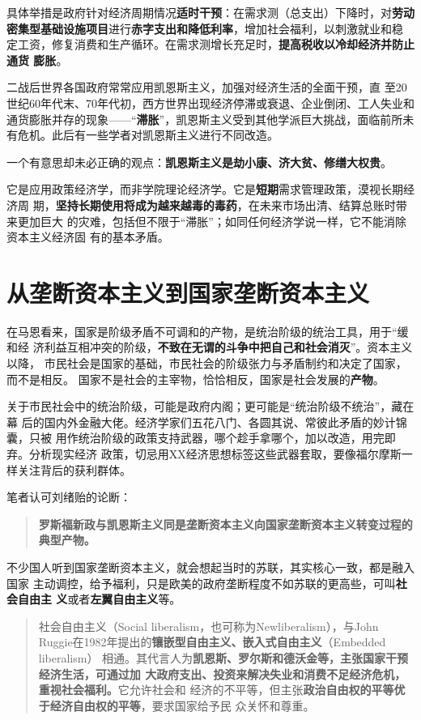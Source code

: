 具体举措是政府针对经济周期情况\textbf{适时干预}：在需求测（总支出）下降时，对\textbf{劳动
  密集型基础设施项目}进行\textbf{赤字支出和降低利率}，增加社会福利，以刺激就业和稳
定工资，修复消费和生产循环。在需求测增长充足时，\textbf{提高税收以冷却经济并防止通货
膨胀}。


二战后世界各国政府常常应用凯恩斯主义，加强对经济生活的全面干预，直
至20世纪60年代末、70年代初，西方世界出现经济停滞或衰退、企业倒闭、工人失业和
通货膨胀并存的现象——“\textbf{滞胀}”，凯恩斯主义受到其他学派巨大挑战，面临前所未
有危机。此后有一些学者对凯恩斯主义进行不同改造。

一个有意思却未必正确的观点：\textbf{凯恩斯主义是劫小康、济大贫、修缮大权贵}。

它是应用政策经济学，而非学院理论经济学。它是\textbf{短期}需求管理政策，漠视长期经济周
期，\textbf{坚持长期使用将成为越来越毒的毒药}，在未来市场出清、结算总账时带来更加巨大
的灾难，包括但不限于“滞胀”；如同任何经济学说一样，它不能消除资本主义经济固
有的基本矛盾。

\section{从垄断资本主义到国家垄断资本主义}

在马恩看来，国家是阶级矛盾不可调和的产物，是统治阶级的统治工具，用于“缓和经
济利益互相冲突的阶级，\textbf{不致在无谓的斗争中把自己和社会消灭}”。资本主义以降，
市民社会是国家的基础，市民社会的阶级张力与矛盾制约和决定了国家，而不是相反。
国家不是社会的主宰物，恰恰相反，国家是社会发展的\textbf{产物}。

关于市民社会中的统治阶级，可能是政府内阁；更可能是“统治阶级不统治”，藏在幕
后的国内外金融大佬。经济学家们五花八门、各圆其说、常彼此矛盾的妙计锦囊，只被
用作统治阶级的政策支持武器，哪个趁手拿哪个，加以改造，用完即弃。分析现实经济
政策，切忌用XX经济思想标签这些武器套取，要像福尔摩斯一样关注背后的获利群体。

笔者认可刘绪贻的论断：
\begin{quotation}
  \textbf{罗斯福新政与凯恩斯主义同是垄断资本主义向国家垄断资本主义转变过程的典型产物。}
\end{quotation}

不少国人听到国家垄断资本主义，就会想起当时的苏联，其实核心一致，都是融入国家
主动调控，给予福利，只是欧美的政府垄断程度不如苏联的更高些，可叫\textbf{社会自由主
  义}或者\textbf{左翼自由主义}等。
\begin{quotation}
  社会自由主义（Social liberalism，也可称为Newliberalism），与John
  Ruggie在1982年提出的\textbf{镶嵌型自由主义、嵌入式自由主义}（Embedded liberalism）
  相通。其代言人为\textbf{凯恩斯、罗尔斯和德沃金等，主张国家干预经济生活，可通过加
    大政府支出、投资来解决失业和消费不足经济危机，重视社会福利。}它允许社会和
  经济的不平等，但主张\textbf{政治自由权的平等优于经济自由权的平等}，要求国家给予民
  众关怀和尊重。\cite{newneo}
\end{quotation}


